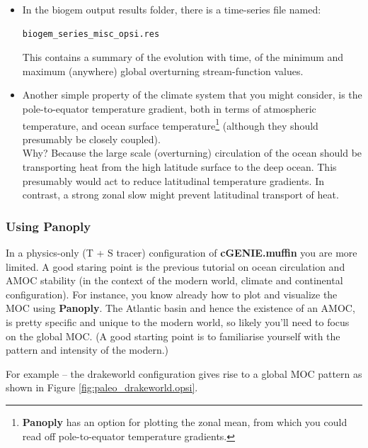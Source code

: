 \documentclass[11pt,fleqn]{book} %
\begin{document}
\vspace{2pt}
\begin{itemize}[noitemsep]
\item In the biogem output results folder, there is a time-series file named:
\vspace{-2pt}\begin{verbatim}
biogem_series_misc_opsi.res
\end{verbatim}\vspace{-2pt}
This contains a summary of the evolution with time, of the minimum and maximum (anywhere) global overturning stream-function values.
\item Another simple property of the climate system that you might consider, is the pole-to-equator temperature gradient, both in terms of atmospheric temperature, and ocean surface temperature\footnote{\textbf{Panoply} has an option for plotting the zonal mean, from which you could read off pole-to-equator temperature gradients.} (although they should presumably be closely coupled).
\\Why? Because the large scale (overturning) circulation of the ocean should be transporting heat from the high latitude surface to the deep ocean. This presumably would act to reduce latitudinal temperature gradients. In contrast, a strong zonal slow might prevent latitudinal transport of heat.
\end{itemize}


\subsubsection{Using Panoply}

In a physics-only (T + S tracer) configuration of \textbf{cGENIE.muffin} you are more limited. A good staring point is the previous tutorial on ocean circulation and AMOC stability (in the context of the modern world, climate and continental configuration). For instance, you know already how to plot and visualize the MOC using \textbf{Panoply}. The Atlantic basin and hence the existence of an AMOC, is pretty specific and unique to the modern world, so likely you'll need to focus on the global MOC. (A good starting point is to familiarise yourself with the pattern and intensity of the modern.)

For example -- the \small\textsf{drakeworld }\normalsize configuration gives rise to a global MOC pattern as shown in Figure \ref{fig:paleo_drakeworld.opsi}.
\end{document}
